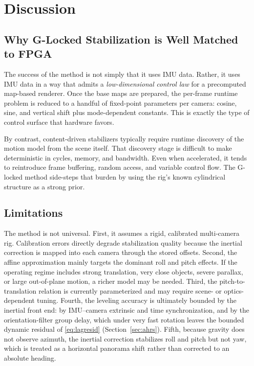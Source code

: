 \documentclass[journal]{IEEEtran}
\begin{document}
\section{Discussion}
\label{sec:discussion}
\subsection{Why G-Locked Stabilization is Well Matched to FPGA}
The success of the method is not simply that it uses IMU data. Rather, it uses IMU data in a way that admits a \emph{low-dimensional control law} for a precomputed map-based renderer. Once the base maps are prepared, the per-frame runtime problem is reduced to a handful of fixed-point parameters per camera: cosine, sine, and vertical shift plus mode-dependent constants. This is exactly the type of control surface that hardware favors.

By contrast, content-driven stabilizers typically require runtime discovery of the motion model from the scene itself. That discovery stage is difficult to make deterministic in cycles, memory, and bandwidth. Even when accelerated, it tends to reintroduce frame buffering, random access, and variable control flow. The G-locked method side-steps that burden by using the rig's known cylindrical structure as a strong prior.

\subsection{Limitations}
The method is not universal. First, it assumes a rigid, calibrated multi-camera rig. Calibration errors directly degrade stabilization quality because the inertial correction is mapped into each camera through the stored offsets. Second, the affine approximation mainly targets the dominant roll and pitch effects. If the operating regime includes strong translation, very close objects, severe parallax, or large out-of-plane motion, a richer model may be needed. Third, the pitch-to-translation relation is currently parameterized and may require scene- or optics-dependent tuning. Fourth, the leveling accuracy is ultimately bounded by the inertial front end: by IMU--camera extrinsic and time synchronization, and by the orientation-filter group delay, which under very fast rotation leaves the bounded dynamic residual of \eqref{eq:lagresid} (Section~\ref{sec:ahrs}). Fifth, because gravity does not observe azimuth, the inertial correction stabilizes roll and pitch but not yaw, which is treated as a horizontal panorama shift rather than corrected to an absolute heading.
\end{document}
